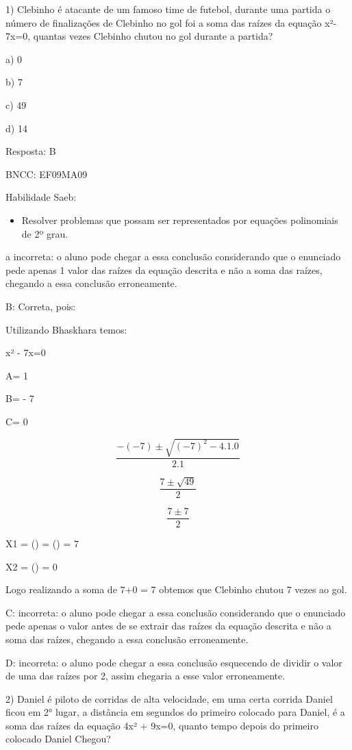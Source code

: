1) Clebinho é atacante de um famoso time de futebol, durante uma partida
o número de finalizações de Clebinho no gol foi a soma das raízes da
equação x²- 7x=0, quantas vezes Clebinho chutou no gol durante a
partida?

a) 0

b) 7

c) 49

d) 14

Resposta: B

BNCC: EF09MA09

Habilidade Saeb:

\begin{itemize}
\tightlist
\item
  Resolver problemas que possam ser representados por equações
  polinomiais de 2º grau.
\end{itemize}

a incorreta: o aluno pode chegar a essa conclusão considerando que o
enunciado pede apenas 1 valor das raízes da equação descrita e não a
soma das raízes, chegando a essa conclusão erroneamente.

B: Correta, pois:

Utilizando Bhaskhara temos:

x² - 7x=0

A= 1

B= - 7

C= 0

\[\frac{- ( - 7) \pm \sqrt{{( - 7)}^{2} - 4.1.0}}{2.1}\]

\[\frac{7 \pm \sqrt{49}}{2}\]

\[\frac{7 \pm 7}{2}\]

X1 = () = () = 7

X2 = () = 0

Logo realizando a soma de 7+0 = 7 obtemos que Clebinho chutou 7 vezes ao
gol.

C: incorreta: o aluno pode chegar a essa conclusão considerando que o
enunciado pede apenas o valor antes de se extrair das raízes da equação
descrita e não a soma das raízes, chegando a essa conclusão
erroneamente.

D: incorreta: o aluno pode chegar a essa conclusão esquecendo de dividir
o valor de uma das raízes por 2, assim chegaria a esse valor
erroneamente.

2) Daniel é piloto de corridas de alta velocidade, em uma certa corrida
Daniel ficou em 2° lugar, a distância em segundos do primeiro colocado
para Daniel, é a soma das raízes da equação 4x² + 9x=0, quanto tempo
depois do primeiro colocado Daniel Chegou?

